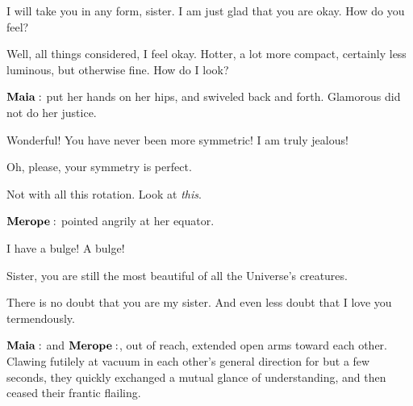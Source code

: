 \Merope I will take you in any form, sister.  I am just glad that you are okay.  How do you feel?

\Maia Well, all things considered, I feel okay.  Hotter, a lot more compact, certainly less luminous, but otherwise fine.  How do I look?

$\Maia$ put her hands on her hips, and swiveled back and forth.  Glamorous did not do her justice.

\Merope Wonderful!  You have never been more symmetric!  I am truly jealous!

\Maia Oh, please, your symmetry is perfect.  

\Merope Not with all this rotation.  Look at \textit{this}.

$\Merope$ pointed angrily at her equator. 

\Merope I have a bulge!  A bulge!

\Maia Sister, you are still the most beautiful of all the Universe's creatures.

\Merope There is no doubt that you are my sister.  And even less doubt that I love you termendously.

$\Maia$ and $\Merope$, out of reach, extended open arms toward each other.  Clawing futilely at vacuum in each other's general direction for but a few seconds, they quickly exchanged a mutual glance of understanding, and then ceased their frantic flailing.


